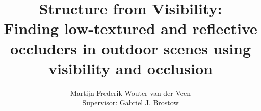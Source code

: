 \documentclass[11pt,a4paper]{article}
\begin{document}
\thispagestyle{empty}

\title{\textbf{Structure from Visibility: \\
       Finding low-textured and reflective occluders in outdoor scenes
       using visibility and occlusion}}
\author{Martijn Frederik Wouter van der Veen \\ Supervisor: Gabriel J. Brostow}
\date{} %
\maketitle\thispagestyle{empty} %


\end{document}
